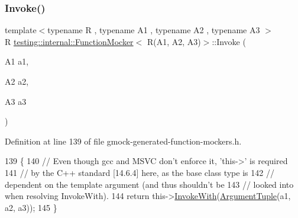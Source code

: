 \subsubsection{\texorpdfstring{Invoke()}{Invoke()}}
{\footnotesize\ttfamily template$<$typename R , typename A1 , typename A2 , typename A3 $>$ \\
R \hyperlink{classtesting_1_1internal_1_1FunctionMocker}{testing\+::internal\+::\+Function\+Mocker}$<$ R(A1, A2, A3)$>$\+::Invoke (\begin{DoxyParamCaption}\item[{A1}]{a1,  }\item[{A2}]{a2,  }\item[{A3}]{a3 }\end{DoxyParamCaption})\hspace{0.3cm}{\ttfamily [inline]}}



Definition at line 139 of file gmock-\/generated-\/function-\/mockers.\+h.


\begin{DoxyCode}
139                                 \{
140     \textcolor{comment}{// Even though gcc and MSVC don't enforce it, 'this->' is required}
141     \textcolor{comment}{// by the C++ standard [14.6.4] here, as the base class type is}
142     \textcolor{comment}{// dependent on the template argument (and thus shouldn't be}
143     \textcolor{comment}{// looked into when resolving InvokeWith).}
144     \textcolor{keywordflow}{return} this->\hyperlink{classtesting_1_1internal_1_1FunctionMockerBase_a869ec713f000b4e7829c660efc25e8cd}{InvokeWith}(\hyperlink{classtesting_1_1internal_1_1FunctionMocker_3_01R_07A1_00_01A2_00_01A3_08_4_a347dcf4c054a5f1fbd0e2f0ad1c5e2f3}{ArgumentTuple}(a1, a2, a3));
145   \}
\end{DoxyCode}
\mbox{\label{classtesting_1_1internal_1_1FunctionMocker_3_01R_07A1_00_01A2_00_01A3_08_4_a349af66650c6d0401dd1c0081773c25a}} 
